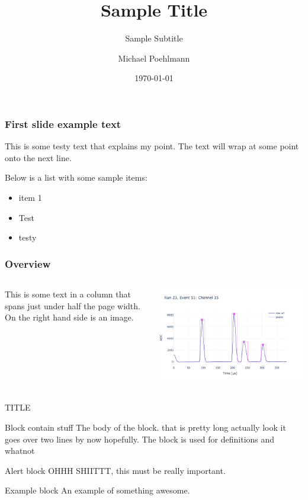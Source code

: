 \documentclass[aspectratio=1610, t]{beamer}  %
\title{Sample Title}
\subtitle{Sample Subtitle}
\author[M. Poehlmann]{Michael Poehlmann}
\institute{UC Davis}
\date{\today}
\begin{document}
\begin{frame}
\titlepage
\end{frame}

\begin{frame}
	\frametitle{First slide example text}
	This is some testy text that explains my point. The text will wrap at some point onto the next line.

	Below is a list with some sample items:

	\begin{itemize}
		\item{item 1}
		\item{Test}
		\item{testy}
	\end{itemize}
\end{frame}

\begin{frame}
	\frametitle{Overview}
	\begin{columns}

		This is some text in a column that spans just under half the page width. On the right hand side is an image.

		\includegraphics[width=\textwidth]{figs/logo.png}
	\end{columns}
\end{frame}

\begin{frame}{TITLE}
	\begin{block}{Block contain stuff}
		The body of the block. that is pretty long actually look it goes over two lines by now hopefully. The block is used for definitions and whatnot
	\end{block}
	\begin{alertblock}{Alert block}
		OHHH SHIITTT, this must be really important.
	\end{alertblock}
	\begin{exampleblock}{Example block}
		An example of something awesome.
	\end{exampleblock}
\end{frame}
\end{document}
